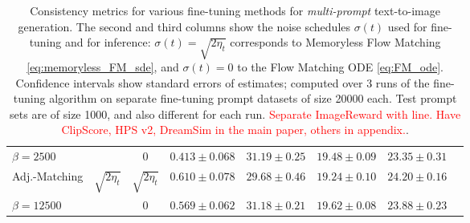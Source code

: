 \documentclass[]{fairmeta}
\begin{document}
\begin{table}[h]
{\begin{tabular}{lccccccc}
    $\beta = 2500$                     &                                    & 0                 & $0.413 \pm 0.068$ & $31.19 \pm 0.25$ & $19.48 \pm 0.09$ & $23.35 \pm 0.31$ \\
    \addlinespace
    Adj.-Matching  & \multirow{2}{*}{$\sqrt{2 \eta_t}$} & $\sqrt{2 \eta_t}$ & $0.610 \pm 0.078$ & $29.68 \pm 0.46$ & $19.24 \pm 0.10$ & $\mathbf{24.20} \pm 0.16$ \\
    $\beta = 12500$                    &                                    & 0                 & $0.569 \pm 0.062$ & $\mathbf{31.18} \pm 0.21$ & $\mathbf{19.62} \pm 0.08$ & $23.88 \pm 0.23$ \\
    \bottomrule
\end{tabular}
}
\caption{Consistency metrics for various fine-tuning methods for \textit{multi-prompt} text-to-image generation. The second and third columns show the noise schedules $\sigma(t)$ used for fine-tuning and for inference: $\sigma(t) = \sqrt{2\eta_t}$ corresponds to Memoryless Flow Matching \eqref{eq:memoryless_FM_sde}, and $\sigma(t) = 0$ to the Flow Matching ODE \eqref{eq:FM_ode}. Confidence intervals show standard errors of estimates; computed over 3 runs of the fine-tuning algorithm on separate fine-tuning prompt datasets of size 20000 each. Test prompt sets are of size 1000, and also different for each run. \textcolor{red}{Separate ImageReward with line. Have ClipScore, HPS v2, DreamSim in the main paper, others in appendix.}.}
\label{table:metrics_multiprompt}
\end{table}
\end{document}
